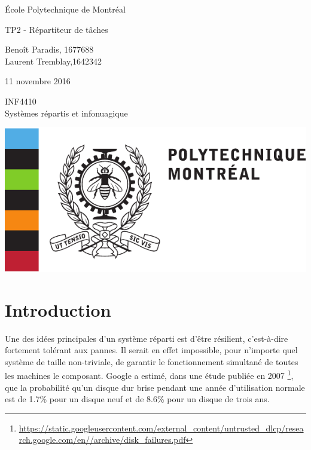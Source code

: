 \thispagestyle{empty}
\begin{center}

{\Large École Polytechnique de Montréal}


\vfill

{\Huge TP2 - Répartiteur de tâches\\}

\vfill

Benoît Paradis,  1677688\\
Laurent Tremblay,1642342 \\ 


\vfill

11 novembre 2016

\vfill

INF4410 \\ 
Systèmes répartis et infonuagique

\vfill

\includegraphics[scale=0.7]{Poly_Logo-eps-converted-to.pdf}

\end{center}
\newpage


\tableofcontents
\newpage


% 

\section{Introduction}

Une des idées principales d'un système réparti est d'être résilient, c'est-à-dire fortement tolérant aux pannes.
Il serait en effet impossible, pour n'importe quel système de taille non-triviale, de garantir le fonctionnement 
simultané de toutes les machines le composant. Google a estimé, dans une étude publiée en 2007 \footnote{\url{https://static.googleusercontent.com/external_content/untrusted_dlcp/research.google.com/en//archive/disk_failures.pdf}}, que la probabilité qu'un disque dur 
brise pendant une année d'utilisation normale est de 1.7\% pour un disque neuf et de 8.6\% pour un disque de trois ans. 

